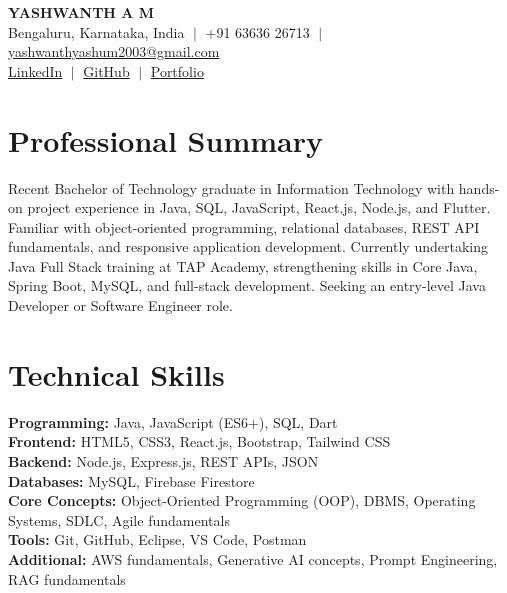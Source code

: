 \documentclass[10pt,a4paper]{article}
\begin{document}
\begin{center}
    {\LARGE \textbf{YASHWANTH A M}}\\[3pt]
    \small Bengaluru, Karnataka, India $\;|\;$ +91 63636 26713 $\;|\;$
    \href{mailto:yashwanthyashum2003@gmail.com}{yashwanthyashum2003@gmail.com}\\[2pt]
    \small \href{https://www.linkedin.com/in/yashwanth-a-m/}{LinkedIn} $\;|\;$
    \href{https://github.com/YASHWANTH025}{GitHub} $\;|\;$
    \href{https://yashwanthportflio.vercel.app}{Portfolio}
\end{center}
\vspace{-5pt}

\section{Professional Summary}
\small{Recent Bachelor of Technology graduate in Information Technology with hands-on project experience in Java, SQL, JavaScript, React.js, Node.js, and Flutter. Familiar with object-oriented programming, relational databases, REST API fundamentals, and responsive application development. Currently undertaking Java Full Stack training at TAP Academy, strengthening skills in Core Java, Spring Boot, MySQL, and full-stack development. Seeking an entry-level Java Developer or Software Engineer role.}

\section{Technical Skills}
\small{
\textbf{Programming:} Java, JavaScript (ES6+), SQL, Dart\\
\textbf{Frontend:} HTML5, CSS3, React.js, Bootstrap, Tailwind CSS\\
\textbf{Backend:} Node.js, Express.js, REST APIs, JSON\\
\textbf{Databases:} MySQL, Firebase Firestore\\
\textbf{Core Concepts:} Object-Oriented Programming (OOP), DBMS, Operating Systems, SDLC, Agile fundamentals\\
\textbf{Tools:} Git, GitHub, Eclipse, VS Code, Postman\\
\textbf{Additional:} AWS fundamentals, Generative AI concepts, Prompt Engineering, RAG fundamentals
}
\end{document}
